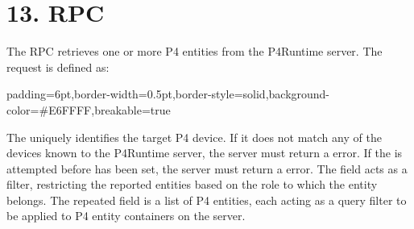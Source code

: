 \documentclass[11pt]{article}
\begin{document}
{%
\section{13.\hspace*{0.5em} RPC}\label{sec-read-rpc}%

\noindent{}The  RPC retrieves one or more P4 entities from the P4Runtime server. The
request is defined as:%

\begin{mdbmargintb}{6pt}{6pt}%
\begin{mdblock}{padding=6pt,border-width=0.5pt,border-style=solid,background-color=\#E6FFFF,breakable=true}%
\begin{mdpre}%
\end{mdpre}%
\end{mdblock}%
\end{mdbmargintb}%

\noindent{}The  uniquely identifies the target P4 device. If it does not match
any of the devices known to the P4Runtime server, the server must return a
 error.
If the  is attempted before  has been set, the
server must return a  error.
The  field acts as a filter, restricting the reported entities based on
the role to which the entity belongs.
The  repeated field is a list of P4 entities, each
acting as a query filter to be applied to P4 entity containers on the server.%

}
\end{document}

